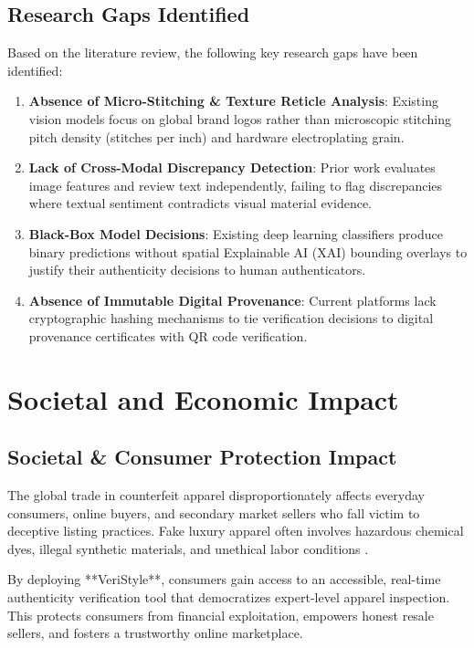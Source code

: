 \documentclass[a4paper,12pt]{report}
\begin{document}
\section{Research Gaps Identified}
Based on the literature review, the following key research gaps have been identified:
\begin{enumerate}
    \item \textbf{Absence of Micro-Stitching \& Texture Reticle Analysis}: Existing vision models focus on global brand logos rather than microscopic stitching pitch density (stitches per inch) and hardware electroplating grain.
    \item \textbf{Lack of Cross-Modal Discrepancy Detection}: Prior work evaluates image features and review text independently, failing to flag discrepancies where textual sentiment contradicts visual material evidence.
    \item \textbf{Black-Box Model Decisions}: Existing deep learning classifiers produce binary predictions without spatial Explainable AI (XAI) bounding overlays to justify their authenticity decisions to human authenticators.
    \item \textbf{Absence of Immutable Digital Provenance}: Current platforms lack cryptographic hashing mechanisms to tie verification decisions to digital provenance certificates with QR code verification.
\end{enumerate}

\newpage

\chapter{Societal and Economic Impact}

\section{Societal \& Consumer Protection Impact}
The global trade in counterfeit apparel disproportionately affects everyday consumers, online buyers, and secondary market sellers who fall victim to deceptive listing practices. Fake luxury apparel often involves hazardous chemical dyes, illegal synthetic materials, and unethical labor conditions \cite{oecd2020trade}. 

By deploying **VeriStyle**, consumers gain access to an accessible, real-time authenticity verification tool that democratizes expert-level apparel inspection. This protects consumers from financial exploitation, empowers honest resale sellers, and fosters a trustworthy online marketplace.
\end{document}
